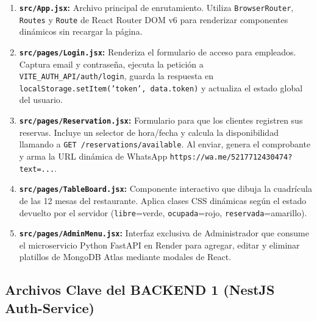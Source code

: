 \documentclass[12pt,a4paper]{article}
\begin{document}
\begin{enumerate}[leftmargin=*]
  \item \textbf{\texttt{src/App.jsx}:} Archivo principal de enrutamiento. Utiliza \texttt{BrowserRouter}, \texttt{Routes} y \texttt{Route} de React Router DOM v6 para renderizar componentes dinámicos sin recargar la página.
  \item \textbf{\texttt{src/pages/Login.jsx}:} Renderiza el formulario de acceso para empleados. Captura email y contraseña, ejecuta la petición a \texttt{VITE\_AUTH\_API/auth/login}, guarda la respuesta en \texttt{localStorage.setItem('token', data.token)} y actualiza el estado global del usuario.
  \item \textbf{\texttt{src/pages/Reservation.jsx}:} Formulario para que los clientes registren sus reservas. Incluye un selector de hora/fecha y calcula la disponibilidad llamando a \texttt{GET /reservations/available}. Al enviar, genera el comprobante y arma la URL dinámica de WhatsApp \texttt{https://wa.me/5217712430474?text=...}.
  \item \textbf{\texttt{src/pages/TableBoard.jsx}:} Componente interactivo que dibuja la cuadrícula de las 12 mesas del restaurante. Aplica clases CSS dinámicas según el estado devuelto por el servidor (\texttt{libre}=verde, \texttt{ocupada}=rojo, \texttt{reservada}=amarillo).
  \item \textbf{\texttt{src/pages/AdminMenu.jsx}:} Interfaz exclusiva de Administrador que consume el microservicio Python FastAPI en Render para agregar, editar y eliminar platillos de MongoDB Atlas mediante modales de React.
\end{enumerate}

\subsection{Archivos Clave del BACKEND 1 (NestJS Auth-Service)}
\end{document}
